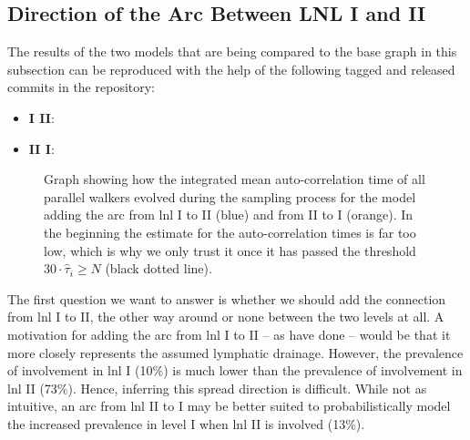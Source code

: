 \documentclass[\relativeRoot/main.tex]{subfiles}
\begin{document}
\subsection{Direction of the Arc Between LNL I and II}
\label{subsec:graph:extended:IandII}

\begin{tcolorbox}[title=\faIcon{recycle} Reproducibility, parbox=false]
    The results of the two models that are being compared to the base graph in this subsection can be reproduced with the help of the following tagged and released commits in the  repository:

    \begin{itemize}
        \item \textbf{I  II}: 
        \item \textbf{II  I}: 
    \end{itemize}
\end{tcolorbox}

\begin{figure}
    \centering
    
    \caption[
        Mean integrated auto-correlation times during sampling
    ]{
        Graph showing how the integrated mean auto-correlation time of all parallel walkers evolved during the sampling process for the model adding the arc from \gls{lnl} I to II (blue) and from II to I (orange). In the beginning the estimate for the auto-correlation times is far too low, which is why we only trust it once it has passed the threshold $30 \cdot \hat{\tau}_i \geq N$ (black dotted line).
    }
    \label{fig:graph:extended:acor}
\end{figure}

The first question we want to answer is whether we should add the connection from \gls{lnl} I to II, the other way around or none between the two levels at all. A motivation for adding the arc from \gls{lnl} I to II -- as  have done -- would be that it more closely represents the assumed lymphatic drainage. However, the prevalence of involvement in \gls{lnl} I (10\%) is much lower than the prevalence of involvement in \gls{lnl} II (73\%). Hence, inferring this spread direction is difficult. While not as intuitive, an arc from \gls{lnl} II to I may be better suited to probabilistically model the increased prevalence in level I when \gls{lnl} II is involved (13\%).
\end{document}
